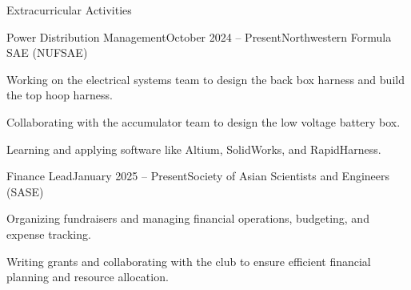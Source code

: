 \documentclass[
    a4paper,
    9pt,
]{resume}
\begin{document}
\begin{rSection}{Extracurricular Activities}
    \begin{rSubsection}{Power Distribution Management}{October 2024 -- Present}{Northwestern Formula SAE (NUFSAE)}{}{}
    	\item Working on the electrical systems team to design the back box harness and build the top hoop harness.
    	\item Collaborating with the accumulator team to design the low voltage battery box.
        	\item Learning and applying software like Altium, SolidWorks, and RapidHarness.
    \end{rSubsection}

\begin{rSubsection}{Finance Lead}{January 2025 -- Present}{Society of Asian Scientists and Engineers (SASE)}{}
	\item Organizing fundraisers and managing financial operations, budgeting, and expense tracking.
    \item Writing grants and collaborating with the club to ensure efficient financial planning and resource allocation.
    \end{rSubsection}




\end{rSection}
\end{document}
